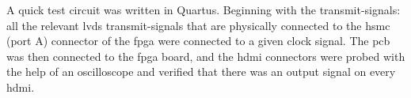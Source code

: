 \documentclass[main.tex]{subfiles}
\begin{document}
A quick test circuit was written in Quartus. Beginning with the transmit-signals: all the relevant \gls{lvds} transmit-signals that are physically connected to the \gls{hsmc} (port A) connector of the \gls{fpga} were connected to a given clock signal. The \gls{pcb} was then connected to the \gls{fpga} board, and the \gls{hdmi} connectors were probed with the help of an oscilloscope and verified that there was an output signal on every \gls{hdmi}.
\end{document}

